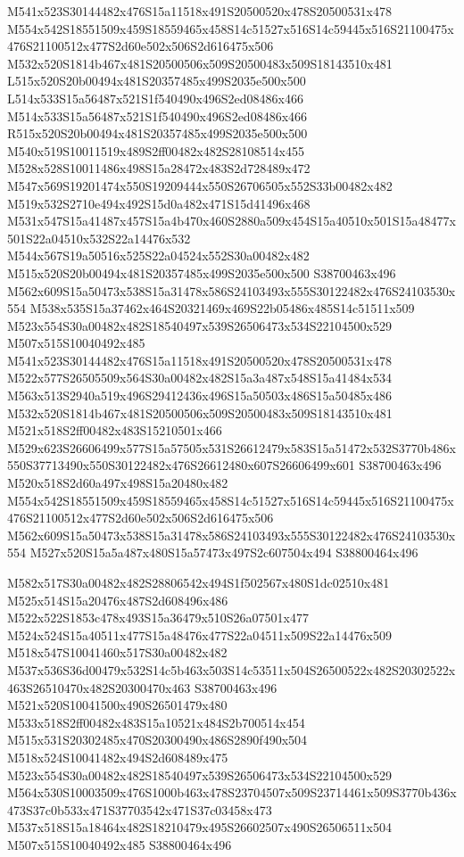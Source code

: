 \documentclass{article}
\begin{document}
\begin{multicols}{2}
M541x523S30144482x476S15a11518x491S20500520x478S20500531x478 M554x542S18551509x459S18559465x458S14c51527x516S14c59445x516S21100475x476S21100512x477S2d60e502x506S2d616475x506 M532x520S1814b467x481S20500506x509S20500483x509S18143510x481 L515x520S20b00494x481S20357485x499S2035e500x500 L514x533S15a56487x521S1f540490x496S2ed08486x466 M514x533S15a56487x521S1f540490x496S2ed08486x466 R515x520S20b00494x481S20357485x499S2035e500x500 M540x519S10011519x489S2ff00482x482S28108514x455 M528x528S10011486x498S15a28472x483S2d728489x472 M547x569S19201474x550S19209444x550S26706505x552S33b00482x482 M519x532S2710e494x492S15d0a482x471S15d41496x468 M531x547S15a41487x457S15a4b470x460S2880a509x454S15a40510x501S15a48477x501S22a04510x532S22a14476x532 M544x567S19a50516x525S22a04524x552S30a00482x482 M515x520S20b00494x481S20357485x499S2035e500x500 S38700463x496 M562x609S15a50473x538S15a31478x586S24103493x555S30122482x476S24103530x554 M538x535S15a37462x464S20321469x469S22b05486x485S14c51511x509 M523x554S30a00482x482S18540497x539S26506473x534S22104500x529 M507x515S10040492x485 M541x523S30144482x476S15a11518x491S20500520x478S20500531x478 M522x577S26505509x564S30a00482x482S15a3a487x548S15a41484x534 M563x513S2940a519x496S29412436x496S15a50503x486S15a50485x486 M532x520S1814b467x481S20500506x509S20500483x509S18143510x481 M521x518S2ff00482x483S15210501x466 M529x623S26606499x577S15a57505x531S26612479x583S15a51472x532S3770b486x550S37713490x550S30122482x476S26612480x607S26606499x601 S38700463x496 M520x518S2d60a497x498S15a20480x482 M554x542S18551509x459S18559465x458S14c51527x516S14c59445x516S21100475x476S21100512x477S2d60e502x506S2d616475x506 M562x609S15a50473x538S15a31478x586S24103493x555S30122482x476S24103530x554 M527x520S15a5a487x480S15a57473x497S2c607504x494 S38800464x496

M582x517S30a00482x482S28806542x494S1f502567x480S1dc02510x481 M525x514S15a20476x487S2d608496x486 M522x522S1853c478x493S15a36479x510S26a07501x477 M524x524S15a40511x477S15a48476x477S22a04511x509S22a14476x509 M518x547S10041460x517S30a00482x482 M537x536S36d00479x532S14c5b463x503S14c53511x504S26500522x482S20302522x463S26510470x482S20300470x463 S38700463x496 M521x520S10041500x490S26501479x480 M533x518S2ff00482x483S15a10521x484S2b700514x454 M515x531S20302485x470S20300490x486S2890f490x504 M518x524S10041482x494S2d608489x475 M523x554S30a00482x482S18540497x539S26506473x534S22104500x529 M564x530S10003509x476S1000b463x478S23704507x509S23714461x509S3770b436x473S37c0b533x471S37703542x471S37c03458x473 M537x518S15a18464x482S18210479x495S26602507x490S26506511x504 M507x515S10040492x485 S38800464x496


\end{multicols}
\end{document}
